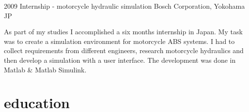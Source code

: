 \documentclass[]{friggeri-cv} %
\begin{document}
\begin{entrylist}
\entry
{2009}
{Internship - motorcycle hydraulic simulation}
{Bosch Corporation, Yokohama JP}
{As part of my studies I accomplished a six months internship in Japan. My task was to create a simulation environment for motorcycle ABS systems. I had to collect requirements from different engineers, research motorcycle hydraulics and then develop a simulation with a user interface. The development was done in Matlab \& Matlab Simulink.

}
\end{entrylist}

\newpage
\section{\color{blue}education}
\end{document}
